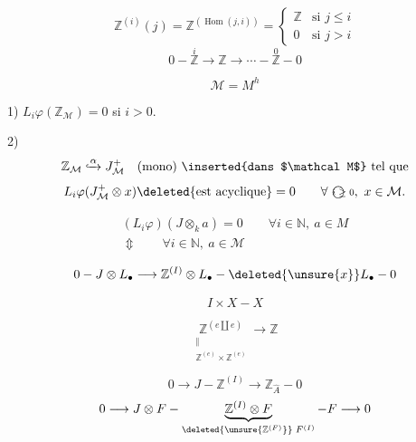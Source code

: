 
\[
\mathbb Z^{(i)}(j)=\mathbb Z^{(\operatorname{Hom}(j,i))}
=\begin{cases}\mathbb Z&\text{si }j\leq i\\0&\text{si }j>i\end{cases}
\]
\[
0\mathbin{-}\overset{i}{\mathbb Z}\longrightarrow\mathbb Z\longrightarrow\cdots
\mathbin{-}\overset{0}{\mathbb Z}\mathbin{-}0
\]



\[
\mathcal M=M^h
\]

1) $L_i\varphi(\mathbb Z_{\mathcal M})=0$ si $i>0$.

2) 
\[
\mathbb Z_{\mathcal M}\lhook\joinrel\xrightarrow{\alpha}J_{\mathcal M}^+
\quad\text{(mono) \inserted{dans $\mathcal M$} tel que}
\]
\[
L_i\varphi(J_{\mathcal M}^+\otimes x)\deleted{\text{est acyclique}}=0
\qquad\forall\ \text{\textcircled{\scriptsize$i\geq0$}},\ x\in\mathcal M.
\]

\[
\begin{gathered}
(L_i\varphi)(J\otimes_k a)=0\qquad\forall i\in\mathbb N,\ a\in M\\
\Updownarrow\qquad\forall i\in\mathbb N,\ a\in\mathcal M
\end{gathered}
\]

\[
0\mathbin{-}J\otimes L_\bullet\longrightarrow\mathbb Z^{(I)}\otimes L_\bullet
\mathbin{-}\deleted{\unsure{x}}L_\bullet\mathbin{-}0
\]


\[
I\times X\mathbin{-}X
\]

\[
\underset{\begin{smallmatrix}\Vert\\\mathbb Z^{(e)}\times\mathbb Z^{(e)}\end{smallmatrix}}
{\mathbb Z^{(e\amalg e)}}\longrightarrow\mathbb Z
\]

\[
0\longrightarrow J\mathbin{-}\mathbb Z^{(I)}\longrightarrow\mathbb Z_{\widehat A}\mathbin{-}0
\]
\[
0\longrightarrow J\otimes F\mathbin{-}
\underbrace{\mathbb Z^{(I)}\otimes F}_{\deleted{\unsure{\mathbb Z^{(F)}}}\;F^{(I)}}
\mathbin{-}F\longrightarrow0
\]

